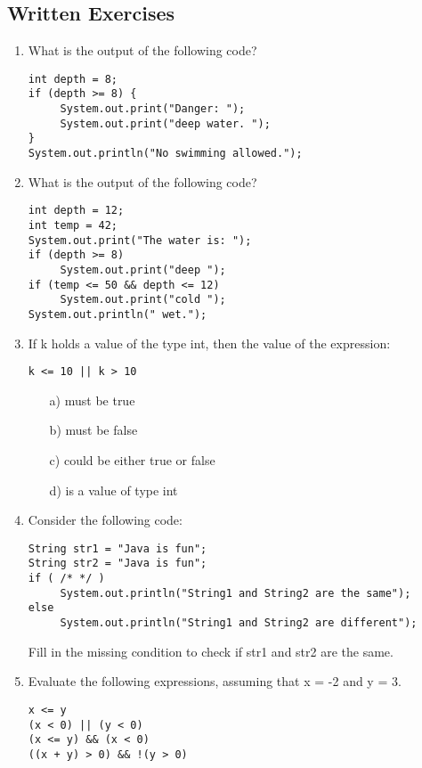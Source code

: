 \subsection{Written Exercises}

\setcounter{counter}{1}
\begin{enumerate}[label={\arabic{counter}\addtocounter{counter}{1}}.]

\item What is the output of the following code?
\begin{lstlisting}
int depth = 8;
if (depth >= 8) {
     System.out.print("Danger: ");
     System.out.print("deep water. ");
}
System.out.println("No swimming allowed.");
\end{lstlisting}

\item What is the output of the following code?
\begin{lstlisting}
int depth = 12;
int temp = 42;
System.out.print("The water is: ");
if (depth >= 8)
     System.out.print("deep ");
if (temp <= 50 && depth <= 12)
     System.out.print("cold ");
System.out.println(" wet.");
\end{lstlisting}

\item If k holds a value of the type int, then the value of the expression:
\begin{lstlisting}
k <= 10 || k > 10
\end{lstlisting}
\begin{enumerate}
\item[a)] must be true
\item[b)] must be false
\item[c)] could be either true or false
\item[d)] is a value of type int
\end{enumerate}

\item Consider the following code:
\begin{lstlisting}
String str1 = "Java is fun";
String str2 = "Java is fun";
if ( /* */ )
     System.out.println("String1 and String2 are the same");
else
     System.out.println("String1 and String2 are different");
\end{lstlisting}
Fill in the missing condition to check if str1 and str2 are the same.

\item Evaluate the following expressions, assuming that x = -2 and y = 3.
\begin{lstlisting} 
x <= y 
(x < 0) || (y < 0)
(x <= y) && (x < 0)
((x + y) > 0) && !(y > 0)
\end{lstlisting}


\end{enumerate}
